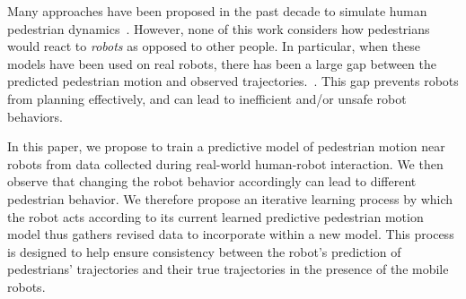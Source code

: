 \documentclass[conference]{IEEEtran}
\begin{document}
Many approaches have been proposed in the 
past decade to simulate human pedestrian dynamics~\cite{lamarche2004crowd, 
karamouzas2009predictive}.
However, none of this work considers how pedestrians would react to \emph{robots} as opposed to other people.  
In particular, when these models have been used on real robots, there has been a large gap between 
the predicted pedestrian motion and observed trajectories.~\cite{trautman2015robot,pfeiffer2016predicting}. 
This gap prevents robots from planning effectively, and can lead to inefficient and/or unsafe robot behaviors.

In this paper, we propose to train a predictive model of pedestrian
motion near robots from data collected during real-world human-robot
interaction.  We then observe that changing the robot behavior
accordingly can lead to different pedestrian behavior.  We therefore
propose an iterative learning process by which the robot acts
according to its current learned predictive pedestrian motion model
thus gathers revised data to incorporate within a new model.  This
process is designed to help ensure consistency between the robot's
prediction of pedestrians' trajectories and their true trajectories in
the presence of the mobile robots.


\end{document}

